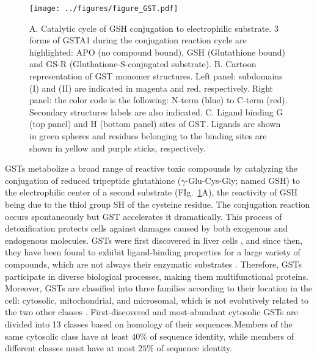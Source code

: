 \begin{figure}[b!]
	\texttt{[image: ../figures/figure\_GST.pdf]}
	\caption{A. Catalytic cycle of GSH conjugation to electrophilic substrate. 3 forms of GSTA1 during the conjugation reaction cycle are highlighted: APO (no compound bound), GSH (Glutathione bound) and GS-R (Gluthatione-S-conjugated substrate). B. Cartoon representation of GST monomer structures. Left panel: subdomains (I) and (II) are indicated in magenta and red, respectively. Right panel: the color code is the following: N-term (blue) to C-term (red). Secondary structures labels are also indicated. C. Ligand binding G (top panel) and H (bottom panel) sites of GST. Ligands are shown in green spheres and residues belonging to the binding sites are shown in yellow and purple sticks, respectively.}
	\label{FIG2}
\end{figure}

GSTs metabolize a broad range of reactive toxic compounds by catalyzing the conjugation of reduced tripeptide glutathione ($\gamma$-Glu-Cys-Gly; named GSH) to the electrophilic center of a second substrate \cite{mannervik1985isoenzymes, armstrong1997structure, hayes2005glutathione} (FIg.~\ref{FIG2}A), the reactivity of GSH being due to the thiol group SH of the cysteine residue. The conjugation reaction occurs spontaneously but GST accelerates it dramatically. This process of detoxification protects cells against damages caused by both exogenous and endogenous molecules. GSTs were first discovered in liver cells \cite{combes1961liver}, and since then, they have been found to exhibit ligand-binding properties for a large variety of compounds, which are not always their enzymatic substrates \cite{axarli2004characterization}. Therefore, GSTs participate in diverse biological processes, making them multifunctional proteins. Moreover, GSTs are classified into three families according to their location in the cell: cytosolic, mitochondrial, and microsomal, which is not evolutively related to the two other classes \cite{oakley2011glutathione}. First-discovered and most-abundant cytosolic GSTs are divided into 13 classes based on homology of their sequences.Members of the same cytosolic class have at least $40\%$ of sequence identity, while members of different classes must have at most $25\%$ of sequence identity. 

